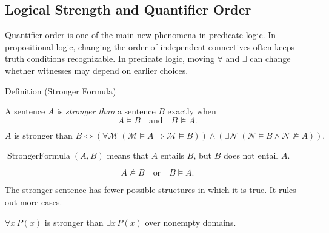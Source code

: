 
\subsection*{Logical Strength and Quantifier Order}

\begin{remark*}
Quantifier order is one of the main new phenomena in predicate logic. In
propositional logic, changing the order of independent connectives often keeps
truth conditions recognizable. In predicate logic, moving \(\forall\) and
\(\exists\) can change whether witnesses may depend on earlier choices.
\end{remark*}

\begin{definitionbox}{Definition (Stronger Formula)}
\begin{definition}
\label{def:strength}
A sentence \(A\) is \emph{stronger than} a sentence \(B\) exactly when
\[
A\models B
\quad\text{and}\quad
B\not\models A.
\]
\end{definition}
\end{definitionbox}

\begin{remark*}
\[
A \text{ is stronger than } B
\Longleftrightarrow
(\forall \mathcal M\;(\mathcal M\models A\Rightarrow\mathcal M\models B))
\land
(\exists \mathcal N\;(\mathcal N\models B\land\mathcal N\not\models A)).
\]
\end{remark*}

\begin{remark*}
\(\operatorname{StrongerFormula}(A,B)\) means that \(A\) entails \(B\), but
\(B\) does not entail \(A\).
\end{remark*}

\begin{remark*}
\[
A\not\models B
\quad\text{or}\quad
B\models A.
\]
\end{remark*}

\begin{remark*}[Interpretation]
The stronger sentence has fewer possible structures in which it is true. It
rules out more cases.
\end{remark*}

\begin{remark*}[Examples]
\(\forall x\,P(x)\) is stronger than \(\exists x\,P(x)\) over nonempty
domains.
\end{remark*}

